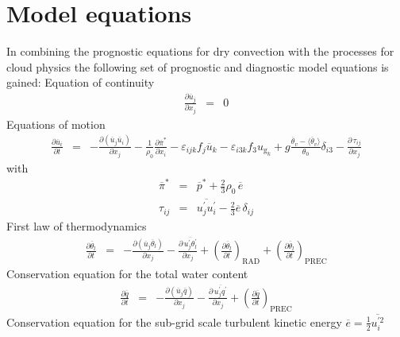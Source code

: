 \documentclass[11pt,a4paper]{scrartcl}
\begin{document}
\section{Model equations}
In combining the prognostic equations for dry convection with the processes for cloud physics the following set of prognostic and diagnostic 
model equations is gained:
\newline
\newline
Equation of continuity
\begin{eqnarray}
 \frac{\partial\overline u_{j}}{\partial x_{j}} & = & 0
 \label{eq:conti}
\end{eqnarray}
Equations of motion
\begin{eqnarray}
 \frac{\partial\overline u_{i}}{\partial t} & = &
  -\frac{\partial \left(\overline u_{j} \overline u_{i}\right)}{\partial x_{j}}  
  -\frac{1}{\rho_{0}}\frac{\partial \overline \pi^{\ast}}{\partial x_{i}} 
  - \varepsilon_{ijk}f_{j}\overline u_{k} - \varepsilon_{i3k}f_{3}u_{\mathrm{g}_{k}}
  + g\frac{\overline\theta_{v}-\langle\overline\theta_{v}\rangle}{\theta_{0}}\delta_{i3} 
  -\frac{\partial\,\tau_{ij}}{\partial x_{j}}
 \label{eq:motion}
\end{eqnarray}
with 
\begin{eqnarray}
 \label{eq:pres}
 \overline \pi^{\ast} & = & \overline p^{\ast} + \frac{2}{3}\rho_{0}\,\overline e \\
 \label{eq:tau}
 \tau_{ij} & = & \overline{u_{j}^{'}u_{i}^{'}} - \frac{2}{3}\overline e\,\delta_{ij} 
\end{eqnarray}
First law of thermodynamics
\begin{eqnarray}
 \frac{\partial\overline \theta_{l}}{\partial t} & = & 
  -\frac{\partial \left(\overline u_{j} \overline \theta_{l}\right)}{\partial x_{j}}
  -\frac{\partial\, \overline{u_{j}^{'}\theta_{l}^{'}}}{\partial x_{j}}  
  +\left(\frac{\partial \overline\theta_{l}}{\partial t}\right)_{\mathrm{RAD}}
  +\left(\frac{\partial \overline\theta_{l}}{\partial t}\right)_{\mathrm{PREC}}
 \label{eq:theta}
\end{eqnarray}
Conservation equation for the total water content
\begin{eqnarray}
 \frac{\partial\overline q}{\partial t} & = & 
  -\frac{\partial \left(\overline u_{j} \overline q\right)}{\partial x_{j}}
  -\frac{\partial\, \overline{u_{j}^{'} q^{'}}}{\partial x_{j}}  
  +\left(\frac{\partial \overline q}{\partial t}\right)_{\mathrm{PREC}}
 \label{eq:total_water}
\end{eqnarray}
Conservation equation for the sub-grid scale turbulent kinetic energy $\overline{e}=\frac{1}{2}\overline{u_{i}^{'2}}$
\end{document}
